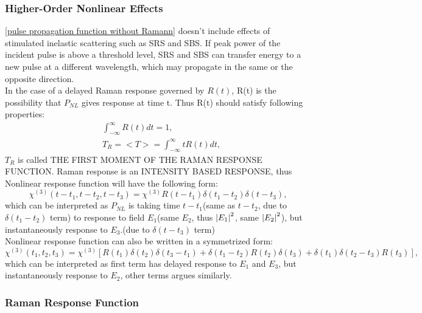 \documentclass[12pt]{extarticle}
\numberwithin{equation}{section}
\numberwithin{figure}{section}
\numberwithin{table}{section}
\newcommand{\<}{\langle}
\renewcommand{\>}{\rangle}
\theoremstyle{definition}
\begin{document}
    \subsubsection{Higher-Order Nonlinear Effects}
        \autoref{pulse propagation function without Ramann} doesn't include effects of stimulated inelastic scattering such as SRS and SBS. If peak power of the incident pulse is above a threshold level, SRS and SBS can transfer energy to a new pulse at a different wavelength, which may propagate in the same or the opposite direction.\\
        In the case of a delayed Raman response governed by $R(t)$, R(t) is the possibility that $P_{NL}$ gives response at time t. Thus R(t) should satisfy following properties:
        \begin{subequations}
        \begin{align}
            &\int_{-\infty}^\infty R(t)dt=1,\\
            &T_R = <T> = \int_{-\infty}^\infty tR(t)dt,
        \end{align}
        \end{subequations}
        $T_R$ is called \MakeUppercase{the first moment of the Raman response function}. Raman response is an \MakeUppercase{intensity based response}, thus Nonlinear response function will have the following form:
        \begin{equation}
            \chi^{(3)}(t-t_1,t-t_2,t-t_3)=\chi^{(3)}R(t-t_1)\delta(t_1-t_2)\delta(t-t_3),
        \end{equation}
        which can be interpreted as $P_{NL}$ is taking time $t-t_1$(same as $t-t_2$, due to $\delta(t_1-t_2)$ term) to response to field $E_1$(same $E_2$, thus $\abs{E_1}^2$, same $\abs{E_2}^2$), but instantaneously response to $E_3$.(due to $\delta(t-t_3)$ term)\\
        Nonlinear response function can also be written in a symmetrized form:
        \begin{equation}
            \chi^{(3)}(t_1,t_2,t_3)=\chi^{(3)}[R(t_1)\delta(t_2)\delta(t_3-t_1)+\delta(t_1-t_2)R(t_2)\delta(t_3)+\delta(t_1)\delta(t_2-t_3)R(t_3)],
        \end{equation}
        which can be interpreted as first term has delayed response to $E_1$ and $E_3$, but instantaneously response to $E_2$, other terms argues similarly.
        
    \subsubsection{Raman Response Function}
    
\end{document}
